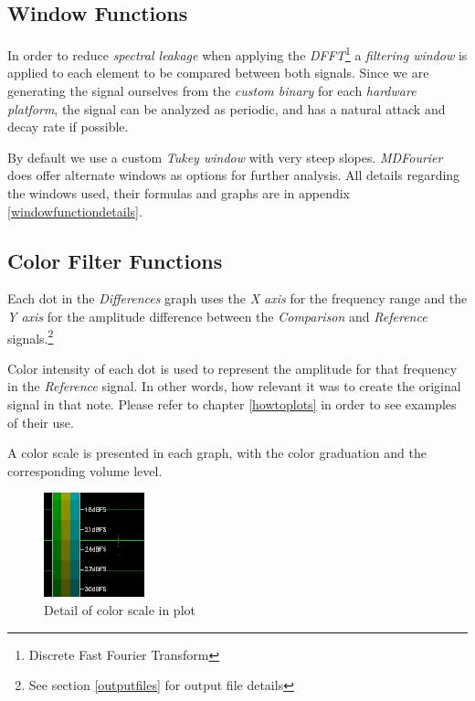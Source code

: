 \documentclass[10pt,a4paper]{report}
\begin{document}
\subsection{Window Functions}
\label{windows}

In order to reduce \textit{spectral leakage} when applying the \textit{DFFT}\footnote{Discrete Fast Fourier Transform} a \textit{filtering window} is applied to each element to be compared between both signals. Since we are generating the signal ourselves from the \textit{custom binary} for each \textit{hardware platform}, the signal can be analyzed as periodic, and has a natural attack and decay rate if possible.

By default we use a custom \textit{Tukey window} with very steep slopes. \textit{MDFourier} does offer alternate windows as options for further analysis. All details regarding the windows used, their formulas and graphs are in appendix \ref{windowfunctiondetails}.

\subsection{Color Filter Functions}
\label{colorfilter}

Each dot in the \textit{Differences} graph uses the \textit{X axis} for the frequency range and the \textit{Y axis} for the amplitude difference between the \textit{Comparison} and \textit{Reference} signals.\footnote{See section \ref{outputfiles} for output file details}

Color intensity of each dot is used to represent the amplitude for that frequency in the \textit{Reference} signal. In other words, how relevant it was to create the original signal in that note. Please refer to chapter \ref{howtoplots} in order to see examples of their use.

A color scale is presented in each graph, with the color graduation and the corresponding volume level.

\begin{figure}[H]
	\centering
	\includegraphics[width=0.2\linewidth]{plots/colorscale.png}
	\caption{Detail of color scale in plot}
	\label{fig:colorscale}
\end{figure}
\end{document}

